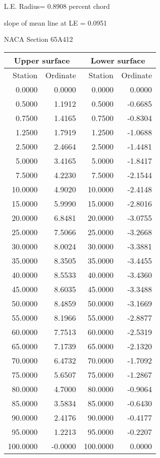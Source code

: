 \documentclass[11pt]{book}
\begin{document}
L.E. Radius=  0.8908 percent chord


 slope of mean line at LE =  0.0951
 \newpage
  \label{s65A412}
 \begin{Large}
 NACA Section 65A412
 \end{Large}
  
 \vspace{8mm}
 \begin{tabular}{|r|r|r|r|} \hline 
 \multicolumn{2}{|c|}{Upper surface} & \multicolumn{2}{|c|}{Lower surface} \\
 \hline
 Station & Ordinate & Station & Ordinate \\
 \hline
0.0000 & 0.0000 & 0.0000 & 0.0000 \\
0.5000 & 1.1912 & 0.5000 & -0.6685 \\
0.7500 & 1.4165 & 0.7500 & -0.8304 \\
1.2500 & 1.7919 & 1.2500 & -1.0688 \\
2.5000 & 2.4664 & 2.5000 & -1.4481 \\
5.0000 & 3.4165 & 5.0000 & -1.8417 \\
7.5000 & 4.2230 & 7.5000 & -2.1544 \\
10.0000 & 4.9020 & 10.0000 & -2.4148 \\
15.0000 & 5.9990 & 15.0000 & -2.8016 \\
20.0000 & 6.8481 & 20.0000 & -3.0755 \\
25.0000 & 7.5066 & 25.0000 & -3.2668 \\
30.0000 & 8.0024 & 30.0000 & -3.3881 \\
35.0000 & 8.3505 & 35.0000 & -3.4455 \\
40.0000 & 8.5533 & 40.0000 & -3.4360 \\
45.0000 & 8.6035 & 45.0000 & -3.3488 \\
50.0000 & 8.4859 & 50.0000 & -3.1669 \\
55.0000 & 8.1966 & 55.0000 & -2.8877 \\
60.0000 & 7.7513 & 60.0000 & -2.5319 \\
65.0000 & 7.1739 & 65.0000 & -2.1320 \\
70.0000 & 6.4732 & 70.0000 & -1.7092 \\
75.0000 & 5.6507 & 75.0000 & -1.2867 \\
80.0000 & 4.7000 & 80.0000 & -0.9064 \\
85.0000 & 3.5834 & 85.0000 & -0.6430 \\
90.0000 & 2.4176 & 90.0000 & -0.4177 \\
95.0000 & 1.2213 & 95.0000 & -0.2207 \\
100.0000 & -0.0000 & 100.0000 & 0.0000 \\
 \hline 
 \end{tabular}
\end{document}
